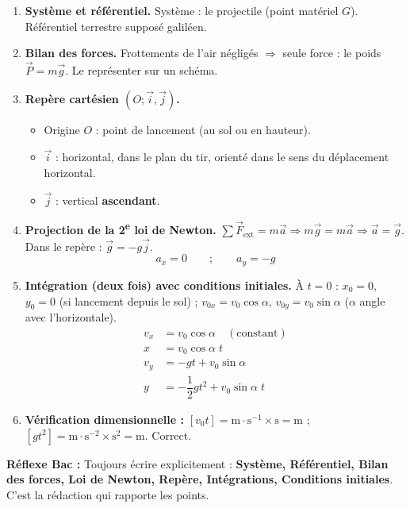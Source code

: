 \documentclass[11pt]{article}
\begin{document}
\begin{methode}
\begin{enumerate}
\item \textbf{Système et référentiel.} Système : le projectile (point matériel $G$). Référentiel terrestre supposé galiléen.
\item \textbf{Bilan des forces.} Frottements de l'air négligés $\Rightarrow$ seule force : le poids $\vec{P}=m\vec{g}$. Le représenter sur un schéma.
\item \textbf{Repère cartésien $(O;\vec{i},\vec{j})$.}
\begin{itemize}
\item Origine $O$ : point de lancement (au sol ou en hauteur).
\item $\vec{i}$ : horizontal, dans le plan du tir, orienté dans le sens du déplacement horizontal.
\item $\vec{j}$ : vertical \textbf{ascendant}.
\end{itemize}
\item \textbf{Projection de la 2\textsuperscript{e} loi de Newton.}
$\sum\vec{F}_{\text{ext}}=m\vec{a} \Rightarrow m\vec{g}=m\vec{a} \Rightarrow \vec{a}=\vec{g}$.
Dans le repère : $\vec{g}=-g\vec{j}$.
\[ a_x=0 \qquad ; \qquad a_y=-g \]
\item \textbf{Intégration (deux fois) avec conditions initiales.}
À $t=0$ : $x_0=0$, $y_0=0$ (si lancement depuis le sol) ; $v_{0x}=v_0\cos\alpha$, $v_{0y}=v_0\sin\alpha$ ($\alpha$ angle avec l'horizontale).
\begin{align*}
v_x &= v_0\cos\alpha \quad (\text{constant}) \\
x &= v_0\cos\alpha\; t \\
v_y &= -gt + v_0\sin\alpha \\
y &= -\dfrac{1}{2}gt^2 + v_0\sin\alpha\; t
\end{align*}
\item \textbf{Vérification dimensionnelle :} $[v_0 t]=\text{m}\cdot\text{s}^{-1}\times\text{s}=\text{m}$ ; $[gt^2]=\text{m}\cdot\text{s}^{-2}\times\text{s}^2=\text{m}$. Correct.
\end{enumerate}
\textbf{Réflexe Bac :} Toujours écrire explicitement : \textbf{Système, Référentiel, Bilan des forces, Loi de Newton, Repère, Intégrations, Conditions initiales}. C'est la rédaction qui rapporte les points.
\end{methode}
\end{document}
